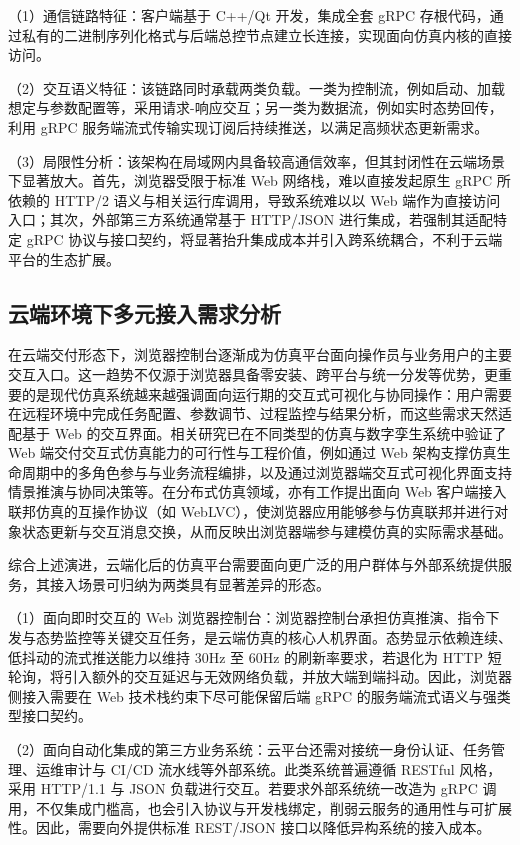 \documentclass[lang=chs, degree=master, blindreview=true, winfonts=true, academic=false]{yanputhesis}
\begin{document}
（1）通信链路特征：客户端基于 C++/Qt 开发，集成全套 gRPC 存根代码，通过私有的二进制序列化格式与后端总控节点建立长连接，实现面向仿真内核的直接访问。

（2）交互语义特征：该链路同时承载两类负载。一类为控制流，例如启动、加载想定与参数配置等，采用请求-响应交互；另一类为数据流，例如实时态势回传，利用 gRPC 服务端流式传输实现订阅后持续推送，以满足高频状态更新需求。

（3）局限性分析：该架构在局域网内具备较高通信效率，但其封闭性在云端场景下显著放大。首先，浏览器受限于标准 Web 网络栈，难以直接发起原生 gRPC 所依赖的 HTTP/2 语义与相关运行库调用，导致系统难以以 Web 端作为直接访问入口；其次，外部第三方系统通常基于 HTTP/JSON 进行集成，若强制其适配特定 gRPC 协议与接口契约，将显著抬升集成成本并引入跨系统耦合，不利于云端平台的生态扩展。


\subsection{云端环境下多元接入需求分析}

在云端交付形态下，浏览器控制台逐渐成为仿真平台面向操作员与业务用户的主要交互入口。这一趋势不仅源于浏览器具备零安装、跨平台与统一分发等优势，更重要的是现代仿真系统越来越强调面向运行期的交互式可视化与协同操作：用户需要在远程环境中完成任务配置、参数调节、过程监控与结果分析，而这些需求天然适配基于 Web 的交互界面。相关研究已在不同类型的仿真与数字孪生系统中验证了 Web 端交付交互式仿真能力的可行性与工程价值，例如通过 Web 架构支撑仿真生命周期中的多角色参与与业务流程编排，以及通过浏览器端交互式可视化界面支持情景推演与协同决策等。在分布式仿真领域，亦有工作提出面向 Web 客户端接入联邦仿真的互操作协议（如 WebLVC），使浏览器应用能够参与仿真联邦并进行对象状态更新与交互消息交换，从而反映出浏览器端参与建模仿真的实际需求基础。

综合上述演进，云端化后的仿真平台需要面向更广泛的用户群体与外部系统提供服务，其接入场景可归纳为两类具有显著差异的形态。

（1）面向即时交互的 Web 浏览器控制台：浏览器控制台承担仿真推演、指令下发与态势监控等关键交互任务，是云端仿真的核心人机界面。态势显示依赖连续、低抖动的流式推送能力以维持 30Hz 至 60Hz 的刷新率要求，若退化为 HTTP 短轮询，将引入额外的交互延迟与无效网络负载，并放大端到端抖动。因此，浏览器侧接入需要在 Web 技术栈约束下尽可能保留后端 gRPC 的服务端流式语义与强类型接口契约。

（2）面向自动化集成的第三方业务系统：云平台还需对接统一身份认证、任务管理、运维审计与 CI/CD 流水线等外部系统。此类系统普遍遵循 RESTful 风格，采用 HTTP/1.1 与 JSON 负载进行交互。若要求外部系统统一改造为 gRPC 调用，不仅集成门槛高，也会引入协议与开发栈绑定，削弱云服务的通用性与可扩展性。因此，需要向外提供标准 REST/JSON 接口以降低异构系统的接入成本。
\end{document}

